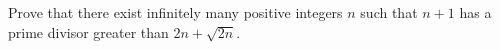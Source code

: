 Prove that there exist infinitely many positive integers $n$ such that $n + 1$ has a prime divisor greater than $2n + \sqrt{2n}$.
